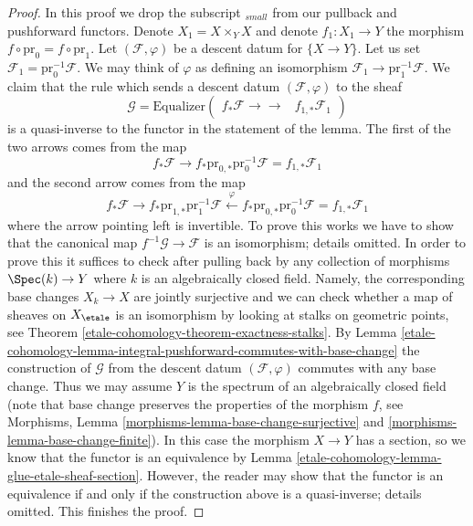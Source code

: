 \begin{proof}
In this proof we drop the subscript ${}_{small}$ from our pullback
and pushforward functors.
Denote $X_1 = X \times_Y X$ and denote $f_1 : X_1 \to Y$ the
morphism $f \circ \text{pr}_0 = f \circ \text{pr}_1$.
Let $(\mathcal{F}, \varphi)$ be a descent datum for $\{X \to Y\}$.
Let us set $\mathcal{F}_1 = \text{pr}_0^{-1}\mathcal{F}$.
We may think of $\varphi$ as defining an isomorphism
$\mathcal{F}_1 \to \text{pr}_1^{-1}\mathcal{F}$.
We claim that the rule which sends a descent datum
$(\mathcal{F}, \varphi)$
to the sheaf
$$
\mathcal{G} =
\text{Equalizer}\left(
\begin{array}{cc}f_*\mathcal{F}
\longrightarrow\longrightarrow & f_{1, *}\mathcal{F}_1\end{array}
\right)
$$
is a quasi-inverse to the functor in the statement of the lemma.
The first of the two arrows comes from the map
$$
f_*\mathcal{F} \to
f_*\text{pr}_{0, *}\text{pr}_0^{-1}\mathcal{F} =
f_{1, *}\mathcal{F}_1
$$
and the second arrow comes from the map
$$
f_*\mathcal{F} \to
f_* \text{pr}_{1, *}\text{pr}_1^{-1}\mathcal{F}
\xleftarrow{\varphi}
f_* \text{pr}_{0, *} \text{pr}_0^{-1}\mathcal{F} =
f_{1, *}\mathcal{F}_1
$$
where the arrow pointing left is invertible.
To prove this works we have to show
that the canonical map $f^{-1}\mathcal{G} \to \mathcal{F}$
is an isomorphism; details omitted. In order to prove this it
suffices to check after pulling back by any collection of morphisms
$\Spec(k) \to Y$ where $k$ is an algebraically closed field.
Namely, the corresponding base changes $X_k \to X$ are jointly
surjective and we can check whether a map of sheaves on $X_\etale$
is an isomorphism by looking at stalks on geometric points, see
Theorem \ref{etale-cohomology-theorem-exactness-stalks}.
By Lemma \ref{etale-cohomology-lemma-integral-pushforward-commutes-with-base-change}
the construction of $\mathcal{G}$ from the descent datum
$(\mathcal{F}, \varphi)$ commutes with any base change.
Thus we may assume $Y$ is the spectrum of an algebraically
closed field (note that base change preserves the properties
of the morphism $f$, see
Morphisms, Lemma \ref{morphisms-lemma-base-change-surjective}
and \ref{morphisms-lemma-base-change-finite}).
In this case the morphism $X \to Y$ has a section, so we
know that the functor is an equivalence by
Lemma \ref{etale-cohomology-lemma-glue-etale-sheaf-section}.
However, the reader may show that the functor is an equivalence
if and only if the construction above is a quasi-inverse;
details omitted. This finishes the proof.
\end{proof}

